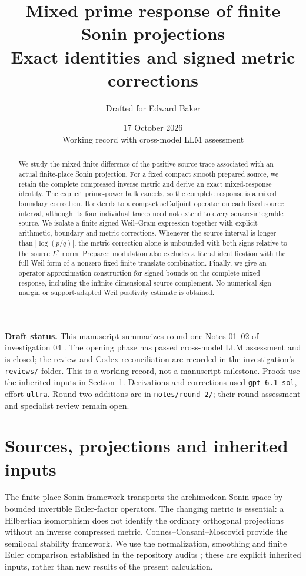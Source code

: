 \documentclass[11pt]{article}
\title{Mixed prime response of finite Sonin projections\\
\large Exact identities and signed metric corrections}
\author{Drafted for Edward Baker}
\date{17 October 2026\\\small Working record with cross-model LLM assessment}
\theoremstyle{remark}
\numberwithin{equation}{section}
\begin{document}
\maketitle
\begin{abstract}
We study the mixed finite difference of the positive source trace associated
with an actual finite-place Sonin projection. For a fixed compact smooth
prepared source, we retain the complete compressed inverse metric and derive
an exact mixed-response identity. The explicit prime-power bulk cancels,
so the complete response is a mixed boundary correction. It extends to a
compact selfadjoint operator on each fixed source interval, although its
four individual traces need not extend to every square-integrable source.
We isolate a finite signed Weil--Gram expression together with explicit
arithmetic, boundary and metric corrections. Whenever the source interval
is longer than \( |\log(p/q)| \), the metric correction alone is unbounded
with both signs relative to the source \(L^2\) norm. Prepared modulation
also excludes a literal identification with the full Weil form of a
nonzero fixed finite translate combination. Finally, we give an operator
approximation construction for signed bounds on the complete mixed
response, including the infinite-dimensional source complement. No
numerical sign margin or support-adapted Weil positivity estimate is obtained.
\end{abstract}

\noindent\textbf{Draft status.}
This manuscript summarizes round-one Notes 01--02 of investigation 04
\cite{note01,note02}. The opening phase has passed cross-model LLM
assessment and is closed; the review and Codex reconciliation are recorded
in the investigation's \texttt{reviews/} folder. This is a working record,
not a manuscript milestone. Proofs use the inherited inputs in
Section~\ref{sec:setup}. Derivations and corrections used
\texttt{gpt-6.1-sol}, effort \texttt{ultra}. Round-two additions are in
\texttt{notes/round-2/}; their round assessment and specialist review remain open.

\section{Sources, projections and inherited inputs}\label{sec:setup}

The finite-place Sonin framework transports the archimedean Sonin space
by bounded invertible Euler-factor operators. The changing metric is
essential: a Hilbertian isomorphism does not identify the ordinary
orthogonal projections without an inverse compressed metric.
Connes--Consani--Moscovici \cite[Theorem 4.6 and Section 4.8]{ccm}
provide the semilocal stability framework. We use the normalization,
smoothing and finite Euler comparison established in the repository
audits \cite{canonical,euler}; these are explicit inherited inputs,
rather than new results of the present calculation.
\end{document}
